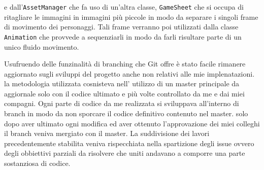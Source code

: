 \documentclass[a4paper,12pt]{report}
\begin{document}
    e dall’\texttt{AssetManager} che fa uso di un’altra classe, \texttt{GameSheet} che si occupa di ritagliare le immagini in immagini più piccole
    in modo da separare i singoli frame di movimento dei personaggi. Tali frame verranno poi utilizzati dalla classe \texttt{Animation} che
    provvede a sequenziarli in modo da farli risultare parte di un unico fluido movimento.
    \par Usufruendo delle funzinalità di branching che Git offre è stato facile rimanere aggiornato sugli sviluppi del progetto anche non
    relativi alle mie implenatazioni. la metodologia utilizzata cosnisteva nell' utilizzo di un master principale da aggiornale solo con
    il codice ultimato e più volte controllato da me e dai miei compagni. Ogni parte di codice da me realizzata si sviluppava all'interno di branch
    in modo da non sporcare il codice definitivo contenuto nel master. solo dopo aver ultimato ogni modifica ed aver ottenuto l'approvazione dei miei colleghi
    il branch veniva mergiato con il master.
    La suddivisione dei lavori precedentemente stabilita veniva rispecchiata nella spartizione degli issue ovvero degli obbiettivi parziali da risolvere che uniti
    andavano a comporre una parte sostanziosa di codice.
\end{document}

